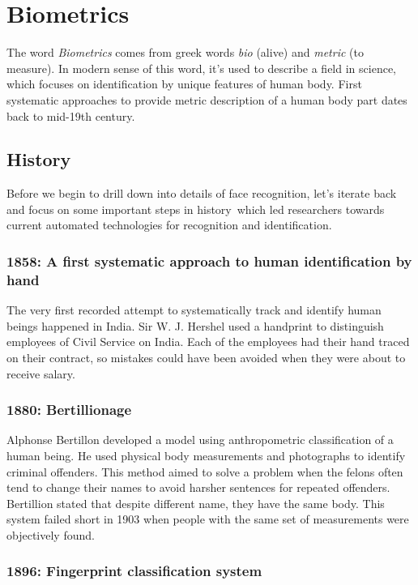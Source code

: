 \section{Biometrics}

The word \textit{Biometrics} comes from greek words \textit{bio} (alive) and \textit{metric} (to measure). In modern sense of this word, it's used to describe a field in science, which focuses on identification by unique features of human body. First systematic approaches to provide metric description of a human body part dates back to mid-19th century.

\subsection{History}

Before we begin to drill down into details of face recognition, let's iterate back and focus on some important steps in history\,\cite{history} which led researchers towards current automated technologies for recognition and identification.

\subsubsection{1858: A first systematic approach to human identification by hand}

The very first recorded attempt to systematically track and identify human beings happened in India. Sir W. J. Hershel used a handprint to distinguish employees of Civil Service on India. Each of the employees had their hand traced on their contract, so mistakes could have been avoided when they were about to receive salary.

\subsubsection{1880: Bertillionage}

Alphonse Bertillon developed a model using anthropometric classification of a human being. He used physical body measurements and photographs to identify criminal offenders. This method aimed to solve a problem when the felons often tend to change their names to avoid harsher sentences for repeated offenders. Bertillion stated that despite different name, they have the same body. This system failed short in 1903 when people with the same set of measurements were objectively found.

\subsubsection{1896: Fingerprint classification system}

